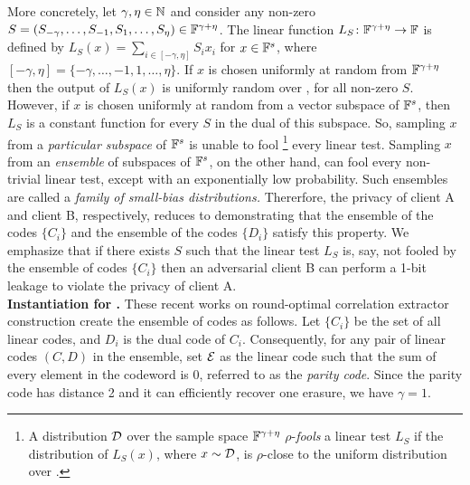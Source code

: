 More concretely, let  $\gamma, \eta \in {\mathbb N}$ and consider any non-zero $S=(S_{-\gamma},\dotsc, S_{-1}, S_1, \dotsc, S_\eta) \in {\mathbb F}^{\gamma + \eta}$. 
The linear function $L_S\colon{\mathbb F}^{\gamma + \eta}\to{\mathbb F}$ is defined by $L_S(x) = \sum_{i \in [-\gamma,\eta]} S_ix_i$ for $x \in {\mathbb F}^s$, where $[-\gamma, \eta] = \{-\gamma,\dotsc,-1,1,\dotsc,\eta\}$.
If $x$ is chosen uniformly at random from  ${\mathbb F}^{\gamma+\eta}$ then the output of $L_S(x)$ is uniformly random over \bbF, for all non-zero $S$. 
However, if $x$ is chosen uniformly at random from a vector subspace of ${\mathbb F}^{s}$, then $L_S$ is a constant function for every $S$ in the dual of this subspace.  
So, sampling $x$ from a {\em particular subspace} of ${\mathbb F}^{s}$ is unable to fool%
\footnote{
	A distribution ${\mathcal D}$ over the sample space ${\mathbb F}^{\gamma+\eta}$ $\rho$-{\em fools} a linear test $L_S$ if the distribution of $L_S(x)$, where $x\sim {\mathcal D}$, is $\rho$-close to the uniform distribution over \bbF. 
}
every linear test.
Sampling $x$ from an {\em ensemble} of subspaces of ${\mathbb F}^{s}$, on the other hand, can fool every non-trivial linear test, except with an exponentially low probability. 
Such ensembles are called a {\em family of small-bias distributions.} 
Thererfore, the privacy of client A and client B, respectively, reduces to demonstrating that the ensemble of the codes $\{C_i\}$ and the ensemble of the codes $\{D_i\}$ satisfy this property.  
We emphasize that if there exists $S$ such that the linear test $L_S$ is, say, not fooled by the ensemble of codes $\{C_i\}$ then an adversarial client B can perform a 1-bit leakage to violate the privacy of client A. \\


\noindent\textbf{Instantiation for \cite{ISIT:IMSW14,C:GIMS15}.} 
These recent works on round-optimal correlation extractor construction create the ensemble of codes as follows. 
Let $\{C_i\}$ be the set of all linear codes, and $D_i$ is the dual code of $C_i$. 
Consequently, for any pair of linear codes $(C,D)$ in the ensemble, set ${\mathcal E}$ as the linear code such that the sum of every element in the codeword is 0, referred to as the {\em parity code}. Since the parity code has distance 2 and it can efficiently recover one erasure, we have $\gamma=1$. 



